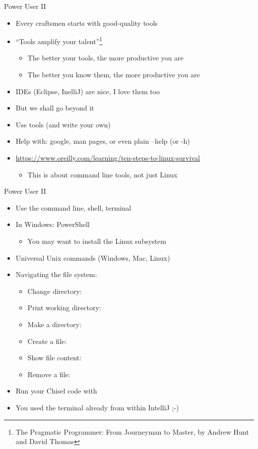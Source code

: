 \begin{frame}[fragile]{Power User II}
\begin{itemize}
\item Every craftsmen starts with good-quality tools
\item ``Tools amplify your talent''\footnote{The Pragmatic Programmer: From Journeyman to Master, by Andrew Hunt and David Thomas}
\begin{itemize}
\item The better your tools, the more productive you are
\item The better you know them, the more productive you are
\end{itemize}
\item IDEs (Eclipse, InelliJ) are nice, I love them too
\item But we shall go beyond it
\item Use tools (and write your own)
\item Help with: google, man pages, or even plain --help (or -h)
\item \url{https://www.oreilly.com/learning/ten-steps-to-linux-survival}
\begin{itemize}
\item This is about command line tools, not just Linux
\end{itemize}
\end{itemize}
\end{frame}

\begin{frame}[fragile]{Power User II}
\begin{itemize}
\item Use the command line, shell, terminal
\item In Windows: PowerShell
\begin{itemize}
\item You may want to install the Linux subsystem
\end{itemize}
\item Universal Unix commands (Windows, Mac, Linux)
\item Navigating the file system:
\begin{itemize}
\item Change directory: 
\item Print working directory: 
\item Make a directory: 
\item Create a file: 
\item Show file content: 
\item Remove a file: 
\end{itemize}
\item Run your Chisel code with 
\item You used the terminal already from within IntelliJ ;-)
\end{itemize}
\end{frame}

